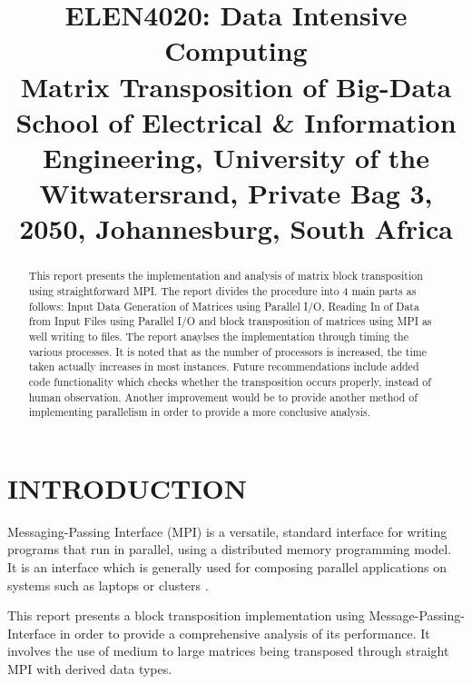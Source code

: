 \documentclass[11pt,conference]{IEEEtran}
\begin{document}
\title{ELEN4020: Data Intensive Computing\\ Matrix Transposition of Big-Data\\
{\footnotesize School of Electrical \& Information Engineering, University of the
Witwatersrand, Private Bag 3, 2050, Johannesburg, South Africa}
}


\author{

\and
{}
\and
{}

}

\maketitle
\begin{abstract}
This report presents the implementation and analysis of matrix block transposition using straightforward MPI. The report divides the procedure into 4 main parts as follows: Input Data Generation of Matrices using Parallel I/O, Reading In of Data from Input Files using Parallel I/O and block transposition of matrices using MPI as well writing to files. The report anaylses the implementation through timing the various processes. It is noted that as the number of processors is increased, the time taken actually increases in most instances. Future recommendations include added code functionality which checks whether the transposition occurs properly, instead of human observation. Another improvement would be to provide another method of implementing parallelism in order to provide a more conclusive analysis.
\end{abstract}
\section{INTRODUCTION}
\noindent
Messaging-Passing Interface (MPI) is a versatile, standard interface for writing programs that run in parallel, using a distributed memory programming model. It is an interface which is generally used for composing parallel applications on systems such as laptops or clusters \cite{gropp2014using}.
\vspace{2mm}

\noindent
This report presents a block transposition implementation using Message-Passing-Interface in order to provide a comprehensive analysis of its performance. It involves the use of medium to large matrices being transposed through straight MPI with derived data types.
\end{document}
